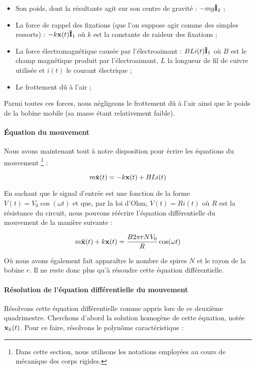 \begin{itemize}
	\item Son poids, dont la résultante agit sur son centre de gravité : $-mg{\bf\hat{ I}}_2$ ;
	\item La force de rappel des fixations (que l'on suppose agir comme des simples
	ressorts) : $-k {\bf x}(t) {\bf\hat{ I}}_1$ où $k$ est la constante de raideur des fixations ;
	\item La force électromagnétique causée par l'électroaimant : $BLi(t) {\bf\hat{ I}}_1$ où
	$B$ est le champ magnétique produit par l'électroaimant, $L$ la longueur de fil de cuivre
	utilisée et $i(t)$ le courant électrique ;
	\item Le frottement dû à l'air ;
\end{itemize}

Parmi toutes ces forces, nous négligeons le frottement dû à l'air ainsi que le poids
de la bobine mobile (sa masse étant relativement faible).

\paragraph{Équation du mouvement}
Nous avons maintenant tout à notre disposition pour écrire les équations du mouvement
\footnote{Dans cette section, nous utilisons les notations employées au cours de
mécanique des corps rigides.} :

$$m\ddot{\bf x}(t) = -k{\bf x}(t) + BLi(t)$$

En sachant que le signal d'entrée est une fonction de la forme $V(t) = V_0 \cos (\omega t)$ et
que, par la loi d'Ohm, $V(t) = Ri(t)$ où $R$ est la résistance du circuit, 
nous pouvons réécrire l'équation différentielle du mouvement de la manière suivante :

$$m\ddot{\bf x}(t) + k{\bf x}(t) = \frac{B2\pi rNV_0}{R}\cos (\omega t)$$

Où nous avons également fait apparaître le nombre de spires $N$ et le rayon de la bobine
$r$. Il ne reste donc plus qu'à résoudre cette équation différentielle.

\paragraph{Résolution de l'équation différentielle du mouvement}
Résolvons cette équation différentielle comme appris lors de ce deuxième
quadrimestre. Cherchons d'abord la solution homogène de cette équation, notée ${\bf x}_h(t)$.
Pour ce faire, résolvons le polynôme caractéristique :


